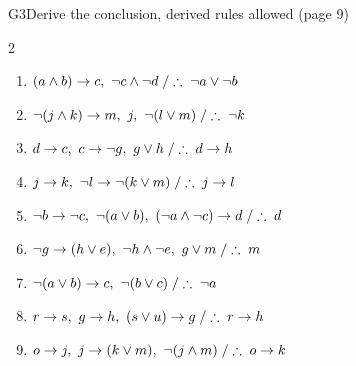 \begin{nbexercise}{G3}{Derive the conclusion, derived rules allowed (page 9)}
\begin{multicols}{2}\small
\begin{enumerate}[nosep]
  \item $(a \land b) \rightarrow c,\ \neg c \land \neg d \;/\therefore\; \neg a \lor \neg b$
  \item $\neg(j \land k) \rightarrow m,\ j,\ \neg(l \lor m) \;/\therefore\; \neg k$
  \item $d \rightarrow c,\ c \rightarrow \neg g,\ g \lor h \;/\therefore\; d \rightarrow h$
  \item $j \rightarrow k,\ \neg l \rightarrow \neg(k \lor m) \;/\therefore\; j \rightarrow l$
  \item $\neg b \limp \neg c,\ \neg(a \lor b),\ (\neg a \land \neg c) \limp d \;/\therefore\; d$
  \item $\neg g \rightarrow (h \lor e),\ \neg h \land \neg e,\ g \lor m \;/\therefore\; m$
  \item $\neg(a \lor b) \rightarrow c,\ \neg(b \lor c) \;/\therefore\; \neg a$
  \item $r \rightarrow s,\ g \rightarrow h,\ (s \lor u) \rightarrow g \;/\therefore\; r \rightarrow h$
  \item $o \limp j,\ j \limp (k \lor m),\ \neg(j \land m) \;/\therefore\; o \limp k$
\end{enumerate}
\end{multicols}
\end{nbexercise}
